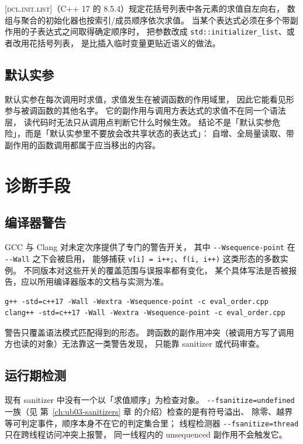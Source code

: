 \documentclass[12pt,a4paper,fontset=fandol]{ctexbook}
\newcommand{\Tp}[1]{\texttt{#1}}
\newcommand{\Opt}[1]{\texttt{-\/-#1}}
\newcommand{\Lang}[1]{\textsf{#1}}
\newcommand{\CPP}{\Lang{C++}}
\newcommand{\Std}[1]{\textsc{[#1]}}
\newcommand{\Clause}[1]{\textsc{\small #1}}
\begin{document}
\Std{dcl.init.list}（\CPP{} 17 的 \Clause{8.5.4}）规定花括号列表中各元素的求值自左向右，
数组与聚合的初始化器也按索引/成员顺序依次求值。
当某个表达式必须在多个带副作用的子表达式之间取得确定顺序时，
把参数改成 \Tp{std::initializer\_list}、或者改用花括号列表，
是比插入临时变量更贴近语义的做法。

\subsection{默认实参}\label{sec:ub08-default-arg}

默认实参在每次调用时求值，求值发生在被调函数的作用域里，
因此它能看见形参与被调函数的其他名字。
它的副作用与调用方表达式的求值不在同一个语法层，
读代码时无法只从调用点判断它什么时候生效。
结论不是「默认实参危险」，而是「默认实参里不要放会改共享状态的表达式」：
自增、全局量读取、带副作用的函数调用都属于应当移出的内容。

\section{诊断手段}\label{sec:ub08-diag}

\subsection{编译器警告}\label{sec:ub08-warn}

GCC 与 Clang 对未定次序提供了专门的警告开关，
其中 \Opt{Wsequence-point} 在 \Opt{Wall} 之下会被启用，
能够捕获 \Tp{v[i] = i++;}、\Tp{f(i, i++)} 这类形态的多数实例。
不同版本对这些开关的覆盖范围与误报率都有变化，
某个具体写法是否被报告，应以所用编译器版本的文档与实测为准。

\begin{lstlisting}[style=shellstyle,caption={打开顺序相关警告}]
g++ -std=c++17 -Wall -Wextra -Wsequence-point -c eval_order.cpp
clang++ -std=c++17 -Wall -Wextra -Wsequence-point -c eval_order.cpp
\end{lstlisting}

警告只覆盖语法模式匹配得到的形态。
跨函数的副作用冲突（被调用方写了调用方也读的对象）无法靠这一类警告发现，
只能靠 sanitizer 或代码审查。

\subsection{运行期检测}\label{sec:ub08-run}

现有 sanitizer 中没有一个以「求值顺序」为检查对象。
\Opt{fsanitize=undefined} 一族（见 第~\ref{ch:ub03-sanitizers} 章 的介绍）检查的是有符号溢出、
除零、越界等可判定事件，顺序本身不在它的判定集合里；
线程检测器 \Opt{fsanitize=thread} 只在跨线程访问冲突上报警，
同一线程内的 unsequenced 副作用不会触发它。
\end{document}

